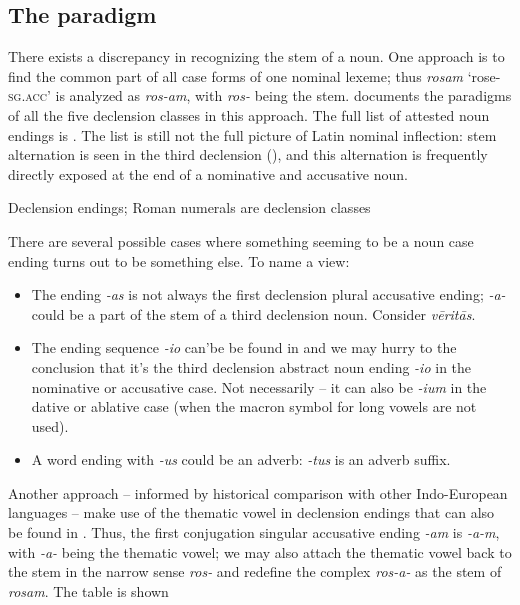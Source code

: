 \documentclass[a4paper, oneside, 12pt]{report}
\newcommand*{\citepage}[1]{p.~{#1}}
\newcommand*{\citepages}[1]{pp.~{#1}}
\newcommand{\form}[1]{\emph{#1}}
\newcommand*{\category}[1]{\textsc{#1}}
\newcommand{\translate}[1]{`#1'}
\begin{document}
\subsection{The paradigm}\label{sec:noun.paradigm.introduction}

There exists a discrepancy in recognizing the stem of a noun.
One approach is to find the common part 
of all case forms of one nominal lexeme;
thus \form{rosam} \translate{rose-\category{sg}.\category{acc}}
is analyzed as \form{ros-am}, 
with \form{ros-} being the stem.
\citet[\citepage{17}]{allen1903allen} documents the paradigms of all the five declension classes 
in this approach.
The full list of attested noun endings is .
The list is still not the full picture of Latin nominal inflection:
stem alternation is seen in the third declension
(),
and this alternation is frequently directly exposed at the end of a nominative and accusative noun.

\begin{table}[H]
    \caption{Declension endings; Roman numerals are declension classes}
    \label{tbl:declension-ending-nouns-list}
    \centering
    
\end{table}

There are several possible cases where something seeming to be a noun case ending 
turns out to be something else.
To name a view:
\begin{itemize}
    \item The ending \form{-as} is not always the first declension plural accusative ending;
    \form{-a-} could be a part of the stem of a third declension noun.
    Consider \form{vēritās}.
    \item The ending sequence \form{-io} can'be be found in 
    and we may hurry to the conclusion 
    that it's the third declension abstract noun ending \form{-io} 
    in the nominative or accusative case.
    Not necessarily -- 
    it can also be \form{-ium} in the dative or ablative case 
    (when the macron symbol for long vowels are not used).
    \item A word ending with \form{-us} could be an adverb:  
        \form{-tus} is an adverb suffix.
\end{itemize}

Another approach -- informed by historical comparison with other Indo-European languages -- 
make use of the thematic vowel 
in declension endings that can also be found in
\citep[\citepages{45, 63}]{oniga2014latin}.
Thus, the first conjugation singular accusative ending \form{-am} 
is \form{-a-m}, 
with \form{-a-} being the thematic vowel;
we may also attach the thematic vowel back to the stem in the narrow sense \form{ros-} 
and redefine the complex \form{ros-a-} as the stem of \form{rosam}.
The table is shown 
\end{document}
